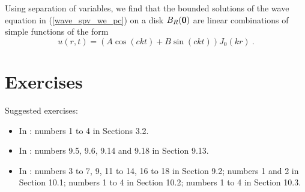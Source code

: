 \begin{rmk}
Using separation of variables, we find that the bounded solutions of
the wave equation in (\ref{wave_spv_we_pc}) on a disk $B_R({\bm{0}})$
are linear combinations of simple functions of the form
\[
u(r,t) = \left(A \cos (ckt) + B \sin (ckt)\right)J_0(k r) \ .
\]
\end{rmk}

\section{Exercises}

Suggested exercises:

\begin{itemize}
\item In \cite{McO}: numbers 1 to 4 in Sections 3.2.
\item In \cite{PinRub}: numbers 9.5, 9.6, 9.14 and 9.18 in Section 9.13.
\item In \cite{Str}: numbers 3 to 7, 9, 11 to 14, 16 to 18 in Section
9.2; numbers 1 and 2 in Section 10.1; numbers 1 to 4 in Section 10.2;
numbers 1 to 4 in Section 10.3.
\end{itemize}

